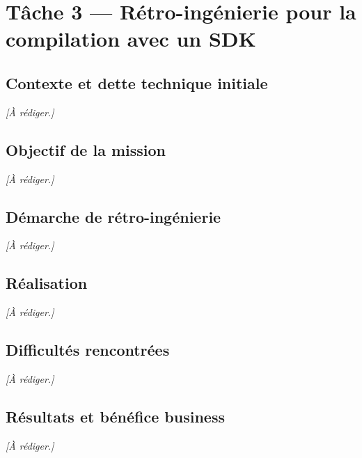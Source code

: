 \chapter{Tâche 3 — Rétro-ingénierie pour la compilation avec un SDK}
\label{chap:t3}

\section{Contexte et dette technique initiale}
\emph{[À rédiger.]}

\section{Objectif de la mission}
\emph{[À rédiger.]}

\section{Démarche de rétro-ingénierie}
\emph{[À rédiger.]}

\section{Réalisation}
\emph{[À rédiger.]}

\section{Difficultés rencontrées}
\emph{[À rédiger.]}

\section{Résultats et bénéfice business}
\emph{[À rédiger.]}
